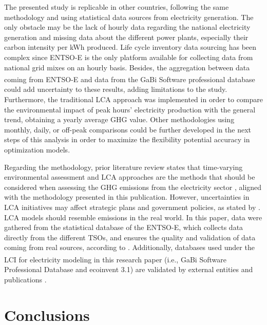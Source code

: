 {{{{The presented study is replicable in other countries, following the same methodology and using statistical data sources from electricity generation. The only obstacle may be the lack of hourly data regarding the national electricity generation and  missing data about the different power plants, especially their carbon intensity per kWh produced. Life cycle inventory data sourcing has been complex since ENTSO-E is the only platform available for collecting data from national grid mixes on an hourly basis. Besides, the aggregation between data coming from ENTSO-E and data from the GaBi\textsuperscript{\textregistered} Software professional database could add  uncertainty to these results, adding limitations to the study. Furthermore, the traditional LCA approach was implemented in order to compare the environmental impact of peak hours' electricity production with the general trend,  obtaining a yearly average GHG value. Other methodologies using monthly, daily, or off-peak comparisons could be further developed in the next steps of this analysis in order to maximize the flexibility potential accuracy in optimization models.

\unskip
Regarding the methodology, prior literature review states that time-varying environmental assessment and LCA approaches are the methods that should  be considered when assessing the GHG emissions from the electricity sector \cite{Khan2019GHGreview, Khan2019CarbonIntensity, Baumann2019, MESSAGIE2014469}, aligned with the methodology presented in this publication. However, uncertainties in LCA initiatives may affect strategic plans and government policies, as stated by \cite{madushela2016data}. LCA models should resemble emissions in the real world. In this paper, data were gathered from the statistical database of the ENTSO-E, which collects data directly from the different TSOs, and ensures the quality and validation of data coming from real sources, according to \cite{Hirth2018ThePlatform}. Additionally, databases used under the LCI for electricity modeling in this research paper (i.e., GaBi\textsuperscript{\textregistered} Software Professional Database and ecoinvent 3.1) are validated by external entities and publications \cite{Buyle2019, 2006ISOGuidelines}.

\newpage
\section{Conclusions} \label{Conclusions}

}}}}
